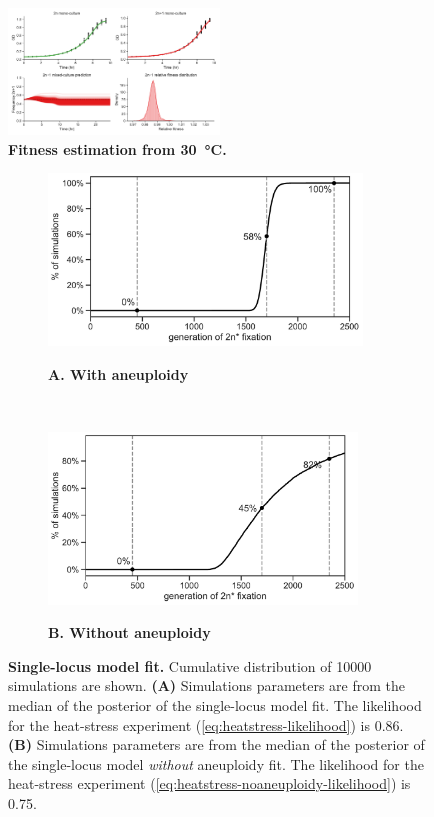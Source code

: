 \documentclass[12pt]{extarticle}
\begin{document}
\begin{figure}[h]
    \centering
	\includegraphics[width=0.5\textwidth]{../figures/evo39_fitness_30deg.pdf}
    \caption{
    \textbf{Fitness estimation from \SI{30}{\celsius}.}
    } 
    \label{fig:growth-curves-30deg}
\end{figure}

\begin{figure}[b!]
  \centering
  \begin{subfigure}[t]{0.5\textwidth}
      \caption{
        \textbf{A. With aneuploidy}
      }
      \centering
      \includegraphics[height=1.8in]{../figures/likelihood-plot.pdf}      
      \label{fig:likelihood-with-aneuploidy}
  \end{subfigure}%
  \\
  \begin{subfigure}[t]{0.5\textwidth}
  	  \caption{
        \textbf{B. Without aneuploidy}
      }
      \centering
      \includegraphics[height=1.8in]{../figures/likelihood-noaneuploidy-plot.pdf}      
      \label{fig:likelihood-without-aneuploidy}
  \end{subfigure}
  \caption{
    \textbf{Single-locus model fit.} Cumulative distribution of 10000 simulations are shown.
    \textbf{(A)} Simulations parameters are from the median of the posterior of the single-locus model fit. The likelihood for the heat-stress experiment (\autoref{eq:heatstress-likelihood}) is 0.86.
    \textbf{(B)} Simulations parameters are from the median of the posterior of the single-locus model \emph{without} aneuploidy fit. The likelihood for the heat-stress experiment (\autoref{eq:heatstress-noaneuploidy-likelihood}) is 0.75.
  }
  \label{fig:likelihood}
\end{figure}
\end{document}
